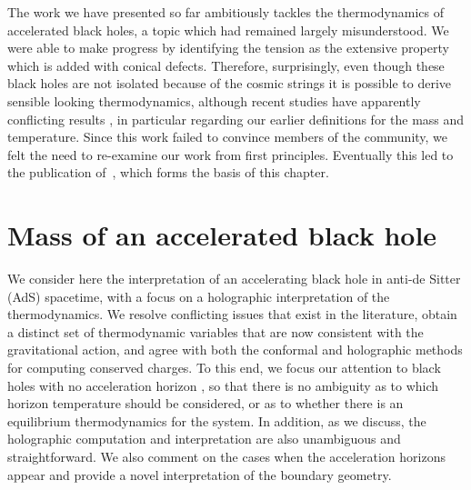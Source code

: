 \documentclass[
twoside,
openright,
frontopenright,
]{dmathesis}
\begin{document}
The work we have presented so far ambitiously tackles the thermodynamics of
accelerated black holes, a topic which had remained largely misunderstood. We
were able to make progress by identifying the tension as the extensive property
which is added with conical defects. Therefore, surprisingly, even though these
black holes are not isolated because of the cosmic strings it is possible to
derive sensible looking thermodynamics, although recent studies have apparently
conflicting results
\cite{Appels:2016uha,Appels:2017xoe,Gregory:2017ogk,Astorino:2016ybm}, in
particular regarding our earlier definitions for the mass and temperature. Since
this work failed to convince members of the community, we felt the need to
re-examine our work from first principles. Eventually this led to the
publication of~\cite{Anabalon:2018ydc}, which forms the basis of this chapter.

\section{Mass of an accelerated black hole}
\label{sec:mass-an-accelerated}

We consider here the interpretation of an accelerating black hole in anti-de
Sitter (AdS) spacetime, with a focus on a holographic interpretation of the
thermodynamics. We resolve conflicting issues that exist in the literature,
obtain a distinct set of thermodynamic variables that are now consistent with
the gravitational action, and agree with both the conformal and holographic
methods for computing conserved charges. To this end, we focus our attention to
black holes with no acceleration horizon \cite{Podolsky:2002nk}, so that there
is no ambiguity as to which horizon temperature should be considered, or as to
whether there is an equilibrium thermodynamics for the system. In addition, as
we discuss, the holographic computation and interpretation are also unambiguous
and straightforward. We also comment on the cases when the acceleration horizons
appear and provide a novel interpretation of the boundary geometry.
\end{document}
